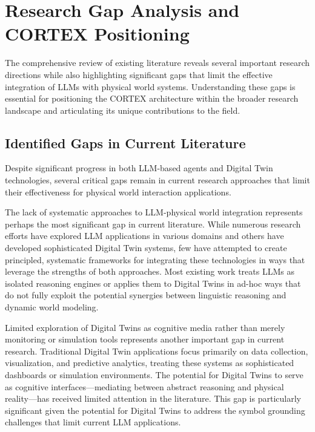 \section{Research Gap Analysis and CORTEX Positioning}

The comprehensive review of existing literature reveals several important research directions while also highlighting significant gaps that limit the effective integration of LLMs with physical world systems. Understanding these gaps is essential for positioning the CORTEX architecture within the broader research landscape and articulating its unique contributions to the field.

\subsection{Identified Gaps in Current Literature}

Despite significant progress in both LLM-based agents and Digital Twin technologies, several critical gaps remain in current research approaches that limit their effectiveness for physical world interaction applications.

The lack of systematic approaches to LLM-physical world integration represents perhaps the most significant gap in current literature. While numerous research efforts have explored LLM applications in various domains and others have developed sophisticated Digital Twin systems, few have attempted to create principled, systematic frameworks for integrating these technologies in ways that leverage the strengths of both approaches. Most existing work treats LLMs as isolated reasoning engines or applies them to Digital Twins in ad-hoc ways that do not fully exploit the potential synergies between linguistic reasoning and dynamic world modeling.

Limited exploration of Digital Twins as cognitive media rather than merely monitoring or simulation tools represents another important gap in current research. Traditional Digital Twin applications focus primarily on data collection, visualization, and predictive analytics, treating these systems as sophisticated dashboards or simulation environments. The potential for Digital Twins to serve as cognitive interfaces—mediating between abstract reasoning and physical reality—has received limited attention in the literature. This gap is particularly significant given the potential for Digital Twins to address the symbol grounding challenges that limit current LLM applications.

